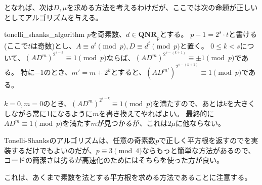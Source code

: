 となれば、次は$D,\mu$を求める方法を考えるわけだが、ここでは次の命題が正しいとしてアルゴリズムを与える。

\begin{Prop}{}{tonelli_shanks_algorithm}
$p$を奇素数、$d\in\mathbf{QNR}_p$とする。
$p-1=2^s\cdot t$と書ける(ここで$t$は奇数)とし、$A\equiv a^t\pmod{p},D\equiv d^t\pmod{p}$と置く。
$0\le k<s$について、$(AD^m)^{2^{s-k}}\equiv1\pmod{p}$ならば、$(AD^m)^{2^{s-(k+1)}}\equiv\pm1\pmod{p}$である。
特に$-1$のとき、$m'=m+2^k$とすると、$(AD^{m'})^{2^{s-(k+1)}}\equiv1\pmod{p}$である。
\end{Prop}

$k=0,m=0$のとき、$(AD^m)^{2^{s-k}}\equiv1\pmod{p}$を満たすので、あとは$k$を大きくしながら常に1になるように$m$を書き換えてやればよい。
最終的に$AD^m\equiv1\pmod{p}$を満たす$m$が見つかるが、これは$2\mu$に他ならない。

Tonelli-Shanksのアルゴリズムは、任意の奇素数$p$で正しく平方根を返すのでを実装するだけでもよいのだが、$p\equiv3\pmod{4}$ならもっと簡単な方法があるので、コードの簡潔さは劣るが高速化のためにはそちらを使った方が良い。


これは、あくまで素数を法とする平方根を求める方法であることに注意する。
